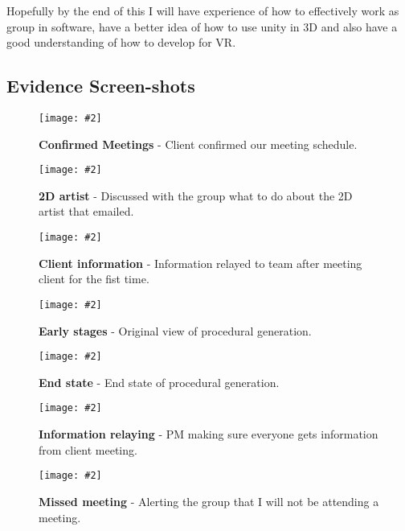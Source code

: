 \documentclass[10pt, a4paper]{article}
\newcommand{\figuremacro}[5]{
    \begin{figure}[#1]
        \centering
        \texttt{[image: \#2]}
        \caption[#3]{\textbf{#3}#4}
        \label{fig:#2}
    \end{figure}
}
\begin{document}
	Hopefully by the end of this I will have experience of how to effectively work as group in software, have a better idea of how to use unity in 3D and also have a good understanding of how to develop for VR.
	
    \subsection{Evidence Screen-shots}
	\figuremacro{h}{meet}{Confirmed Meetings}{ - Client confirmed our meeting schedule.}{1.0}
	
	\figuremacro{h}{2d}{2D artist}{ - Discussed with the group what to do about the 2D artist that emailed.}{1.0}
	
	\figuremacro{h}{sa}{Client information}{ - Information relayed to team after meeting client for the fist time.}{1.0}
	
	\figuremacro{h}{original}{Early stages}{ - Original view of procedural generation.}{1.0}
	
	\figuremacro{h}{recent}{End state}{ - End state of procedural generation.}{1.0}
	
	\figuremacro{h}{pm}{Information relaying}{ - PM making sure everyone gets information from client meeting.}{1.0}
	
	\figuremacro{h}{missing}{Missed meeting}{ - Alerting the group that I will not be attending a meeting.}{1.0}
	
		
\end{document}
